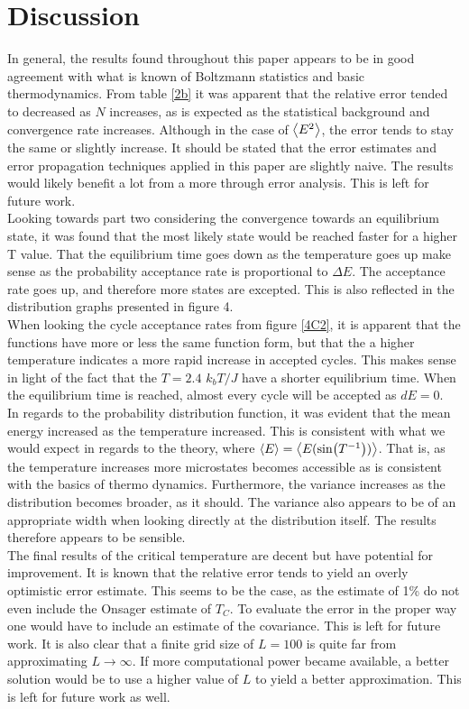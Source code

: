 \documentclass[%
reprint,nofootinbib,
amsmath,amssymb,
aps,
]{revtex4-1}
\begin{document}
\section{Discussion} \noindent 
In general, the results found throughout this paper appears to be in good agreement with what is known of Boltzmann statistics and basic thermodynamics. From table \ref{2b} it was apparent that the relative error tended to decreased as $N$ increases, as is expected as the statistical background and convergence rate increases. Although in the case of $\expval{E^2}$, the error tends to stay the same or slightly increase. It should be stated that the error estimates and error propagation techniques applied in this paper are slightly naive. The results would likely benefit a lot from a more through error analysis. This is left for future work.\\  \indent 
Looking towards part two considering the convergence towards an equilibrium state, it was found that the most likely state would be reached faster for a higher T value. That the equilibrium time goes down as the temperature goes up make sense as the probability acceptance rate is proportional to $\Delta E$. The acceptance rate goes up, and therefore more states are excepted. This is also reflected in the distribution graphs presented in figure 4. \\ \indent 
When looking the cycle acceptance rates from figure \ref{4C2}, it is apparent that the functions have more or less the same function form, but that the a higher temperature indicates a more rapid increase in accepted cycles. This makes sense in light of the fact that the $T = 2.4$ $k_bT/J$ have a shorter equilibrium time. When the equilibrium time is reached, almost every cycle will be accepted as $dE = 0$. \\ \indent
In regards to the probability distribution function, it was evident that the mean energy increased as the temperature increased. This is consistent with what we would expect in regards to the theory, where $\expval{E} = \expval{E(\sin(T^{-1}))}$. That is, as the temperature increases more microstates becomes accessible as is consistent with the basics of thermo dynamics. Furthermore, the variance increases as the distribution becomes broader, as it should. The variance also appears to be of an appropriate width when looking directly at the distribution itself. The results therefore appears to be sensible.  \\ \indent
The final results of the critical temperature are decent but have potential for improvement. It is known that the relative error tends to yield an overly optimistic error estimate. This seems to be the case, as the estimate of 1\% do not even include the Onsager estimate of $T_C$.  To evaluate the error in the proper way one would have to include an estimate of the covariance. This is left for future work. It is also clear that a finite grid size of $L = 100$ is quite far from approximating $L\rightarrow\infty$. If more computational power became available, a better solution would be to use a higher value of $L$ to yield a better approximation. This is left for future work as well. 
\end{document}
